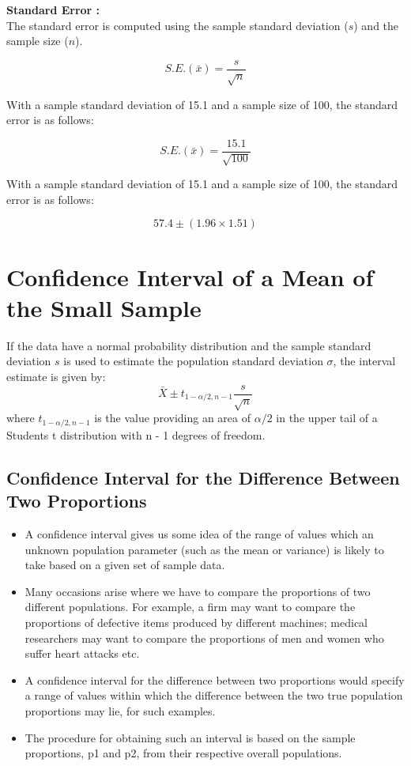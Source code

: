 \documentclass[]{report}
\begin{document}
\textbf{Standard Error :}\\
The standard error is computed using the sample standard deviation ($s$) and the sample size ($n$).

\[ S.E. (\bar{x}) = \frac{s}{\sqrt{n}} \]









With a sample standard deviation of 15.1 and a sample size of 100, the standard error is as follows:


\[ S.E. (\bar{x}) = \frac{15.1}{\sqrt{100}} \]



With a sample standard deviation of 15.1 and a sample size of 100, the standard error is as follows:


\[ 57.4 \pm \left( 1.96 \times 1.51 \right) \]


\section{Confidence Interval of a Mean of the Small Sample}

If the data have a normal probability distribution and the sample standard deviation $s$ is used to estimate the population standard deviation $\sigma$, the interval estimate is given by:
\begin{equation}
\bar{X} \pm t_{1-\alpha/2,n-1}\frac{s}{\sqrt{n}}
\end{equation}
where $t_{1-\alpha/2,n-1}$ is the value providing an area of $\alpha/2$ in the upper tail of a Students t distribution with n - 1 degrees of freedom.


\subsection*{Confidence Interval for the Difference Between Two Proportions}
\begin{itemize}
\item A confidence interval gives us some idea of the range of values which an unknown population parameter (such as the mean or variance) is likely to take based on a given set of sample data.

\item Many occasions arise where we have to compare the proportions of two different populations. For example, a firm may want to compare the proportions of defective items produced by different machines; medical researchers may want to compare the proportions of men and women who suffer heart attacks etc. 
\item A confidence interval for the difference between two proportions would specify a range of values within which the difference between the two true population proportions may lie, for such examples.

\item The procedure for obtaining such an interval is based on the sample proportions, p1 and p2, from their respective overall populations.
\end{itemize}

\end{document}
